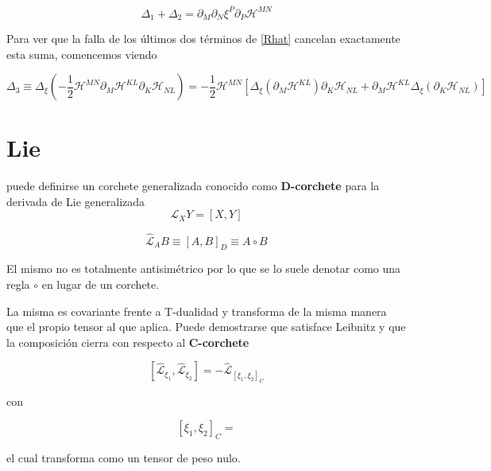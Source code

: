 \documentclass{article}
\numberwithin{equation}{section}
\begin{document}
\begin{equation}\label{key}
\Delta_1 + \Delta_2 = \partial_M\partial_N\xi^P\partial_P\mathcal{H}^{MN} 
\end{equation} 

Para ver que la falla de los últimos dos términos de \ref{Rhat} cancelan exactamente esta suma, comencemos viendo

\begin{equation}\label{key}
\Delta_3 \equiv \Delta_{\xi} \left(- \frac{1}{2} \mathcal{H}^{MN}\partial_M \mathcal{H}^{KL}\partial_K \mathcal{H}_{NL}\right) = - \frac{1}{2} \mathcal{H}^{MN} \left[\Delta_{\xi}\left( \partial_M \mathcal{H}^{KL} \right)\partial_K \mathcal{H}_{NL} + \partial_M \mathcal{H}^{KL}\Delta_{\xi}\left(\partial_K \mathcal{H}_{NL}\right)\right]
\end{equation}


























\section{Lie}

puede definirse un corchete generalizada conocido como \textbf{D-corchete} para la derivada de Lie generalizada
\begin{equation}\label{key}
\mathcal{L}_X Y = \left[X,Y\right]
\end{equation}

\begin{equation}\label{key}
\hat{\mathcal{L}}_A B \equiv \left[A,B\right]_D \equiv A \circ B
\end{equation}  

El mismo no es totalmente antisimétrico por lo que se lo suele denotar como una regla $ \circ $ en lugar de un corchete.

La misma es covariante frente a T-dualidad y transforma de la misma manera que el propio tensor al que aplica. Puede demostrarse que satisface Leibnitz y que la composición cierra con respecto al \textbf{C-corchete}

\begin{equation}\label{key}
\left[\hat{\mathcal{L}}_{\xi_1},\hat{\mathcal{L}}_{\xi_2}\right] = -\hat{\mathcal{L}}_{\left[\xi_1,\xi_2\right]_C}
\end{equation}

con

\begin{equation}\label{key}
\left[\xi_1,\xi_2\right]_C=
\end{equation}

el cual transforma como un tensor de peso nulo.
\end{document}
